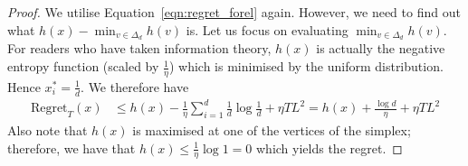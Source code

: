 \begin{proof}
We utilise Equation~\ref{eqn:regret_forel} again. However, we need to find out what $h(x) - \min_{v \in \Delta_d} h(v)$ is. Let us focus on evaluating $\min_{v \in \Delta_d} h(v)$. For readers who have taken information theory, $h(x)$ is actually the negative entropy function (scaled by $\frac{1}{\eta}$) which is minimised by the uniform distribution. Hence $x_i^* = \frac{1}{d}$. We therefore have \begin{align*}
    \text{Regret}_T(x) &\leq h(x) - \frac{1}{\eta}\sum_{i=1}^d \frac{1}{d} \log \frac{1}{d} + \eta TL^2= h(x) + \frac{\log d}{\eta}  + \eta TL^2
\end{align*}
Also note that $h(x)$ is maximised at one of the vertices of the simplex; therefore, we have that $h(x) \leq \frac{1}{\eta} \log 1 = 0$ which yields the regret.
\end{proof}



